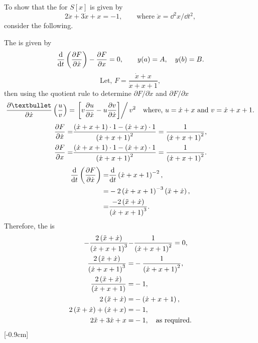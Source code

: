 To show that the \el for $S[x]$ is given by
\[
	2\ddot{x} + 3\dot{x} + x = -1,\qquad\textrm{where } \ddot{x} = \dd^2x/\dd t^2,
\]
consider the following.

The \el is given by%
\[
	\ELEd{F}{t}{x},\qquad y(a)=A,\quad y(b)=B.
\]
\[
	\textrm{Let, } F = \frac{\dot{x} + x}{\dot{x} + x + 1},
\]
then using the quotient rule to determine $\partial F/\partial\dot{x}$ and $\partial F/\partial x$
\begin{align*}
		\pderiv{•}{\dot{x}}\lr{\frac{u}{v}} = \left.\lrs{v\pderiv{u}{\dot{x}} - u\pderiv{v}{\dot{x}}}\right/v^2\quad\textrm{where, }u=\dot{x} + x\textrm{ and } v=\dot{x} + x + 1.
\end{align*}
\begin{align*}
	\pderiv{F}{\dot{x}} =& \frac{\lr{\dot{x} + x + 1}\cdot 1 - \lr{\dot{x} + x}\cdot 1}{\lr{\dot{x} + x + 1}^2} = \frac{1}{\lr{\dot{x} + x + 1}^2},\\
	\pderiv{F}{x} =& \frac{\lr{\dot{x} + x + 1}\cdot 1 - \lr{\dot{x} + x}\cdot 1}{\lr{\dot{x} + x + 1}^2} = \frac{1}{\lr{\dot{x} + x + 1}^2}.
\end{align*}
\begin{align*}
	\deriv{}{t}\lr{\pderiv{F}{\dot{x}}} =& \deriv{}{t}\lr{\dot{x} + x + 1}^{-2},\\
	=& -2\lr{\dot{x} + x + 1}^{-3}\lr{\ddot{x}+\dot{x}},\\
	=& \frac{-2\lr{\ddot{x}+\dot{x}}}{\lr{\dot{x} + x + 1}^{3}}.
\end{align*}
Therefore, the \el is
\begin{align}
	-\frac{2\lr{\ddot{x}+\dot{x}}}{\lr{\dot{x} + x + 1}^{3}} -& \frac{1}{\lr{\dot{x} + x + 1}^{2}} = 0,\nonumber\\
	\frac{2\lr{\ddot{x}+\dot{x}}}{\lr{\dot{x} + x + 1}^{3}} =& -\frac{1}{\lr{\dot{x} + x + 1}^{2}},\nonumber\\
	\frac{2\lr{\ddot{x}+\dot{x}}}{\lr{\dot{x} + x + 1}} =& -1,\nonumber\\
	2\lr{\ddot{x}+\dot{x}} =& -\lr{\dot{x} + x + 1},\nonumber\\
	2\lr{\ddot{x}+\dot{x}} + \lr{\dot{x} + x} =& -1,\nonumber\\
	\label{eq:6.2}
	2\ddot{x} + 3\dot{x} + x =&-1,\quad\textrm{as required.}
\end{align}
[-0.9cm]%
